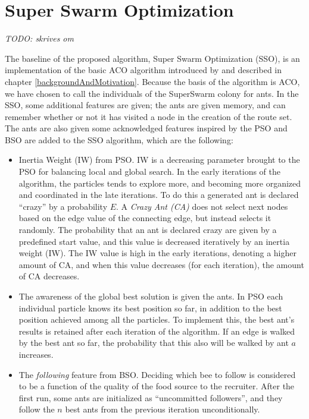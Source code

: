 \section{Super Swarm Optimization}

\emph{\color{blue} TODO: skrives om}

The baseline of the proposed algorithm, Super Swarm Optimization (SSO), is an implementation of the basic ACO algorithm introduced by \citet{nanda11} and described in chapter \vref{backgroundAndMotivation}. Because the basis of the algorithm is ACO, we have chosen to call the individuals of the SuperSwarm colony for ants. %
In the SSO, some additional features are given; the ants are given memory, and can remember whether or not it has visited a node in the creation of the route set. The ants are also given some acknowledged features inspired by the PSO and BSO are added to the SSO algorithm, which are the following:

\begin{itemize}
\item Inertia Weight (IW) from PSO. IW is a decreasing parameter brought to the PSO for balancing local and global search. In the early iterations of the algorithm, the particles tends to explore more, and becoming more organized and coordinated in the late iterations. To do this a generated ant is declared ``crazy'' by a probability $E$. A \textit{Crazy Ant (CA)} does not select next nodes based on the edge value of the connecting edge, but instead selects it randomly. The probability that an ant is declared crazy are given by a predefined start value, and this value is decreased iteratively by an inertia weight (IW). The IW value is high in the early iterations, denoting a higher amount of CA, and when this value decreases (for each iteration), the amount of CA decreases.
\item The awareness of the global best solution is given the ants. In PSO each individual particle knows its best position so far, in addition to the best position achieved among all the particles. To implement this, the best ant's results is retained after each iteration of the algorithm. If an edge is walked by the best ant so far, the probability that this also will be walked by ant $a$ increases.
\item The \textit{following} feature from BSO. Deciding which bee to follow is considered to be a function of the quality of the food source to the recruiter. After the first run, some ants are initialized as ``uncommitted followers'', and they follow the $n$ best ants from the previous iteration unconditionally.
\end{itemize}


